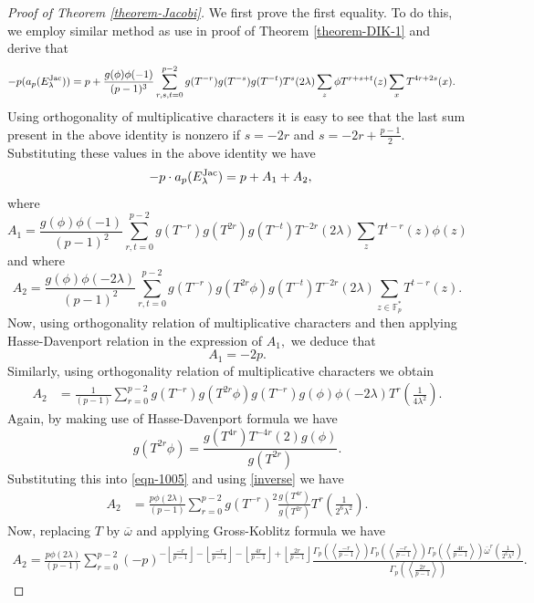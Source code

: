 \documentclass[10pt,a4paper]{amsart}
\newcommand{\jac}{\text{{\rm{Jac}}}}
\begin{document}
\begin{proof}[Proof of Theorem \ref{theorem-Jacobi}] We first prove the first equality. To do this, we 
employ similar method as use in proof of Theorem \ref{theorem-DIK-1} and derive that
\begin{align}
 -p(a_p(E_\lambda^{\jac}))&=p+\frac{g(\phi)\phi(-1)}{(p-1)^3}\sum_{r,s,t=0}^{p-2}g(T^{-r})g(T^{-s})g(T^{-t})T^s(2\lambda)\sum_{z}\phi T^{r+s+t}(z)\sum_{x}T^{4r+2s}(x).\notag
\end{align}
Using orthogonality of multiplicative characters it is easy to see that the last sum present in the above identity is nonzero if  $s=-2r$ and $s=-2r+\frac{p-1}{2}.$ Substituting these values in the above identity we have 
\begin{align}\label{eqn-1004}
-p\cdot a_p(E^{\jac}_{\lambda})&=p+A_1+A_2,
\end{align}
\noindent where $$A_1=\frac{g(\phi)\phi(-1)}{(p-1)^2}\sum\limits_{r,t=0}^{p-2}g(T^{-r})g(T^{2r})g(T^{-t})T^{-2r}(2\lambda)\sum_{z}T^{t-r}(z)\phi(z)$$ and 
where $$A_2=\frac{g(\phi)\phi(-2\lambda)}{(p-1)^2}\sum_{r,t=0}^{p-2}g(T^{-r})g(T^{2r}\phi)g(T^{-t})T^{-2r}(2\lambda)\sum_{z\in \mathbb F_p^*}T^{t-r}(z).$$
Now, using orthogonality relation of multiplicative characters and then applying Hasse-Davenport relation in the expression of $A_1,$ we deduce that $$A_1=-2p.$$
\noindent Similarly, using orthogonality relation of multiplicative characters we obtain
\begin{align}\label{eqn-1005}
  A_2&=\frac{1}{(p-1)}\sum_{r=0}^{p-2}g(T^{-r})g(T^{2r}\phi)g(T^{-r})g(\phi)\phi(-2\lambda)T^{r}\left(\frac{1}{4\lambda^2}\right).
\end{align}
Again, by making use of Hasse-Davenport formula we have $$g(T^{2r}\phi)=\frac{g(T^{4r}){T}^{-4r}(2)g(\phi)}{g(T^{2r})}.$$
Substituting this into \eqref{eqn-1005} and using \eqref{inverse} we have 
\begin{align}\label{eqn-1006}
  A_2&=\frac{p\phi(2\lambda)}{(p-1)}\sum_{r=0}^{p-2}g(T^{-r})^2\frac{g(T^{4r})}{g(T^{2r})}T^{r}\left(\frac{1}{2^6\lambda^2}\right).
\end{align}
Now, replacing $T$ by $\overline{\omega}$ and applying Gross-Koblitz formula we have 
\begin{align}\label{eqn-1010}
A_2=\frac{p \phi(2\lambda)}{(p-1)}\sum_{r=0}^{p-2}(-p)^{-\left\lfloor\frac{-r}{p-1}\right\rfloor-\left\lfloor\frac{-r}{p-1}\right\rfloor-\left\lfloor\frac{4r}{p-1}\right\rfloor+\left\lfloor\frac{2r}{p-1}\right\rfloor}
\frac{ \Gamma_p\left(\left\langle\frac{-r}{p-1}\right\rangle\right) \Gamma_p\left(\left\langle\frac{-r}{p-1}\right\rangle\right)\Gamma_p\left(\left\langle\frac{4r}{p-1}\right\rangle\right)\overline{\omega}^{r}(\frac{1}{2^6\lambda^2})}{\Gamma_p\left(\left\langle\frac{2r}{p-1}\right\rangle\right)}.

\end{align}
\end{proof}
\end{document}
